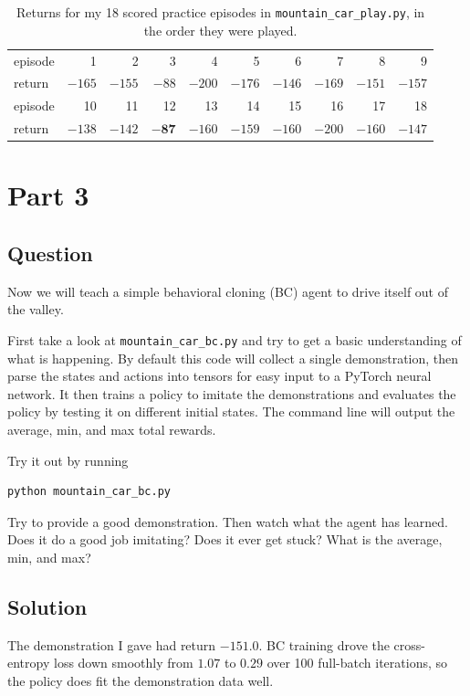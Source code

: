 \documentclass[12pt]{article}%
\begin{document}
\begin{table}[h]
\centering
\small
\caption{Returns for my 18 scored practice episodes in \texttt{mountain\_car\_play.py},
in the order they were played.}
\begin{tabular}{lrrrrrrrrr}
\toprule
episode & 1 & 2 & 3 & 4 & 5 & 6 & 7 & 8 & 9 \\
return  & $-165$ & $-155$ & $-88$ & $-200$ & $-176$ & $-146$ & $-169$ & $-151$ & $-157$ \\
\midrule
episode & 10 & 11 & 12 & 13 & 14 & 15 & 16 & 17 & 18 \\
return  & $-138$ & $-142$ & $\mathbf{-87}$ & $-160$ & $-159$ & $-160$ & $-200$ & $-160$ & $-147$ \\
\bottomrule
\end{tabular}
\label{tab:p2}
\end{table}





\section{Part 3}

\subsection{Question}
Now we will teach a simple behavioral cloning (BC) agent to drive itself out of
the valley.

First take a look at \texttt{mountain\_car\_bc.py} and try to get a basic
understanding of what is happening. By default this code will collect a single
demonstration, then parse the states and actions into tensors for easy input to a
PyTorch neural network. It then trains a policy to imitate the demonstrations and
evaluates the policy by testing it on different initial states. The command line
will output the average, min, and max total rewards.

Try it out by running
\begin{verbatim}
python mountain_car_bc.py
\end{verbatim}
Try to provide a good demonstration. Then watch what the agent has learned. Does
it do a good job imitating? Does it ever get stuck? What is the average, min, and
max?

\subsection{Solution}
The demonstration I gave had return $-151.0$. BC training drove the
cross-entropy loss down smoothly from $1.07$ to $0.29$ over 100 full-batch iterations, so
the policy does fit the demonstration data well.
\end{document}
